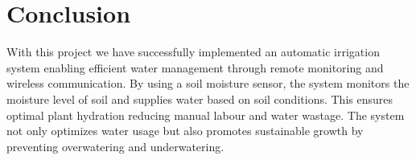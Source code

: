 \newpage
\chapter{Conclusion}
With this project we have successfully implemented an automatic
irrigation system enabling efficient water management through remote
monitoring and wireless communication. By using a soil moisture
sensor, the system monitors the moisture level of soil and supplies
water based on soil conditions. This ensures optimal plant hydration
reducing manual labour and water wastage. The system not only
optimizes water usage but also promotes sustainable growth by
preventing overwatering and underwatering.
